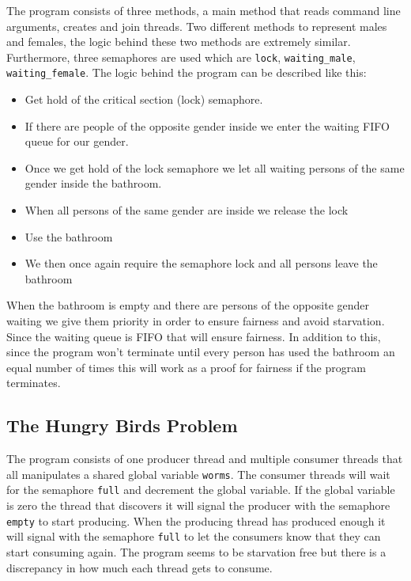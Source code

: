\documentclass{article}
\begin{document}
The program consists of three methods, a main method that reads command line arguments, creates and join threads. Two different methods to represent males and females, the logic behind these two methods are extremely similar. Furthermore, three semaphores are used which are \texttt{lock}, \texttt{waiting\_male}, \texttt{waiting\_female}. The logic behind the program can be described like this: 
\begin{itemize}
\item Get hold of the critical section (lock) semaphore.
\item If there are people of the opposite gender inside we enter the waiting FIFO queue for our gender. 
\item Once we get hold of the lock semaphore we let all waiting persons of the same gender inside the bathroom. 
\item When all persons of the same gender are inside we release the lock
\item Use the bathroom
\item We then once again require the semaphore lock and all persons leave the bathroom 
\end{itemize}
When the bathroom is empty and there are persons of the opposite gender waiting we give them priority in order to ensure fairness and avoid starvation. Since the waiting queue is FIFO that will ensure fairness. In addition to this, since the program won’t terminate until every person has used the bathroom an equal number of times this will work as a proof for fairness if the program terminates.


\subsection{The Hungry Birds Problem}

The program consists of one producer thread and multiple consumer threads that all manipulates a shared global variable \texttt{worms}. The consumer threads will wait for the semaphore \texttt{full} and decrement the global variable. If the global variable is zero the thread that discovers it will signal the producer with the semaphore \texttt{empty} to start producing. When the producing thread has produced enough it will signal with the semaphore \texttt{full} to let the consumers know that they can start consuming again. The program seems to be starvation free but there is a discrepancy in how much each thread gets to consume. 
\end{document}
